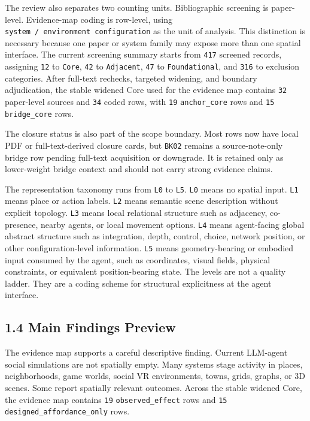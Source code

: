 \documentclass[
  twocolumn]{article}
\begin{document}
The review also separates two counting units. Bibliographic screening is
paper-level. Evidence-map coding is row-level, using
\texttt{system\ /\ environment\ configuration} as the unit of analysis.
This distinction is necessary because one paper or system family may
expose more than one spatial interface. The current screening summary
starts from \texttt{417} screened records, assigning \texttt{12} to
\texttt{Core}, \texttt{42} to \texttt{Adjacent}, \texttt{47} to
\texttt{Foundational}, and \texttt{316} to exclusion categories. After
full-text rechecks, targeted widening, and boundary adjudication, the
stable widened Core used for the evidence map contains \texttt{32}
paper-level sources and \texttt{34} coded rows, with \texttt{19}
\texttt{anchor\_core} rows and \texttt{15} \texttt{bridge\_core} rows.

The closure status is also part of the scope boundary. Most rows now
have local PDF or full-text-derived closure cards, but \texttt{BK02}
remains a source-note-only bridge row pending full-text acquisition or
downgrade. It is retained only as lower-weight bridge context and should
not carry strong evidence claims.

The representation taxonomy runs from \texttt{L0} to \texttt{L5}.
\texttt{L0} means no spatial input. \texttt{L1} means place or action
labels. \texttt{L2} means semantic scene description without explicit
topology. \texttt{L3} means local relational structure such as
adjacency, co-presence, nearby agents, or local movement options.
\texttt{L4} means agent-facing global abstract structure such as
integration, depth, control, choice, network position, or other
configuration-level information. \texttt{L5} means geometry-bearing or
embodied input consumed by the agent, such as coordinates, visual
fields, physical constraints, or equivalent position-bearing state. The
levels are not a quality ladder. They are a coding scheme for structural
explicitness at the agent interface.

\subsection{1.4 Main Findings Preview}\label{main-findings-preview}

The evidence map supports a careful descriptive finding. Current
LLM-agent social simulations are not spatially empty. Many systems stage
activity in places, neighborhoods, game worlds, social VR environments,
towns, grids, graphs, or 3D scenes. Some report spatially relevant
outcomes. Across the stable widened Core, the evidence map contains
\texttt{19} \texttt{observed\_effect} rows and \texttt{15}
\texttt{designed\_affordance\_only} rows.
\end{document}
